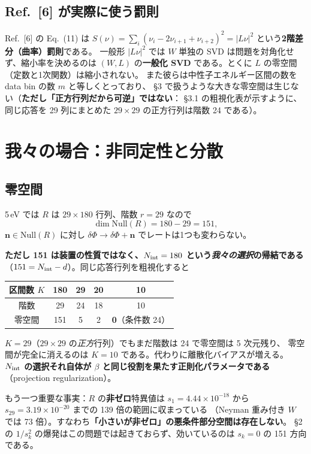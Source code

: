 \documentclass[11pt,a4paper]{ltjsarticle}
\newcommand{\dP}{\delta\Phi}
\newcommand{\Nint}{N_{\rm int}}
\begin{document}
\subsection{Ref.~[6] が実際に使う罰則}
Ref.~[6] の Eq.~(11) は
$S(\nu)=\sum_i(\nu_i-2\nu_{i+1}+\nu_{i+2})^2=|L\nu|^2$ という\textbf{2階差分（曲率）罰則}である。
一般形 $|L\nu|^2$ では $W$ 単独の SVD は問題を対角化せず、縮小率を決めるのは
$(W,L)$ の\textbf{一般化 SVD} である。とくに $L$ の零空間（定数と1次関数）は縮小されない。
また彼らは中性子エネルギー区間の数を data bin の数 $m$ と等しくとっており、
\S3 で扱うような大きな零空間は生じない（\textbf{ただし「正方行列だから可逆」ではない}：
\S3.1 の粗視化表が示すように、同じ応答を 29 列にまとめた $29\times29$ の正方行列は階数 24 である）。

\section{我々の場合：非同定性と分散}

\subsection{零空間}
5\,eV では $R$ は $29\times180$ 行列、階数 $r=29$ なので
\begin{equation}
\dim\mathrm{Null}(R)=180-29=151,
\end{equation}
$\bm n\in\mathrm{Null}(R)$ に対し $\dP\to\dP+\bm n$ でレートは1つも変わらない。

\textbf{ただし 151 は装置の性質ではなく、$\Nint=180$ という\emph{我々の選択}の帰結である}
（$151=\Nint-d$）。同じ応答行列を粗視化すると
\begin{center}\small
\begin{tabular}{ccccc}
\toprule
区間数 $K$ & 180 & 29 & 20 & 10\\
\midrule
階数 & 29 & 24 & 18 & 10\\
零空間 & 151 & 5 & 2 & \textbf{0}（条件数 24）\\
\bottomrule
\end{tabular}
\end{center}
$K=29$（$29\times29$ の\emph{正方}行列）でもまだ階数は 24 で零空間は 5 次元残り、
零空間が完全に消えるのは $K=10$ である。代わりに離散化バイアスが増える。
\textbf{$\Nint$ の選択それ自体が $\beta$ と同じ役割を果たす正則化パラメータである}
（projection regularization）。

もう一つ重要な事実：$R$ の\textbf{非ゼロ}特異値は
$s_1=4.44\times10^{-18}$ から $s_{29}=3.19\times10^{-20}$ までの 139 倍の範囲に収まっている
（Neyman 重み付き $W$ では 73 倍）。すなわち\textbf{「小さいが非ゼロ」の悪条件部分空間は存在しない}。
\S2 の $1/s_k^2$ の爆発はこの問題では起きておらず、効いているのは $s_k=0$ の 151 方向である。
\end{document}
